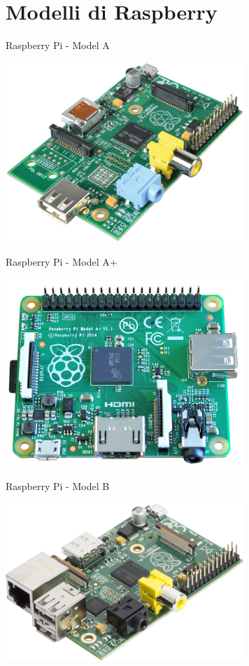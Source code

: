 \documentclass[xcolor=svgnames,11pt]{beamer}
\begin{document}
\section{Modelli di Raspberry}

\begin{frame}{Raspberry Pi - Model A}
\begin{center}
\includegraphics[width=9cm]{raspiA.png}
\end{center}
\end{frame}

\begin{frame}{Raspberry Pi - Model A+}
\begin{center}
\includegraphics[width=9cm]{raspiA+.png}
\end{center}
\end{frame}

\begin{frame}{Raspberry Pi - Model B}
\begin{center}
\includegraphics[width=9cm]{raspiB.png}
\end{center}
\end{frame}
\end{document}
